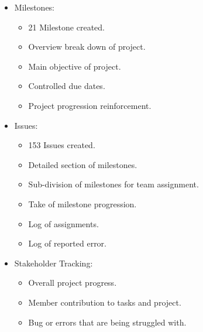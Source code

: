 \documentclass[letterpaper]{article}
\begin{document}
		\begin{itemize}
			\item Milestones:
				\begin{itemize}
					\item 21 Milestone created.
					\item Overview break down of project.
					\item Main objective of project.
					\item Controlled due dates.
					\item Project progression reinforcement.
				\end{itemize}
			\item Issues:
				\begin{itemize}
					\item 153 Issues created.
					\item Detailed section of milestones.
					\item Sub-division of milestones for team assignment.
					\item Take of milestone progression.
					\item Log of assignments.
					\item Log of reported error.
				\end{itemize}
			\item Stakeholder Tracking:
				\begin{itemize}
					\item Overall project progress.
					\item Member contribution to tasks and project.
					\item Bug or errors that are being struggled with.
				\end{itemize}
		\end{itemize}
		
		\vspace{0.2in}
	\section*{\colorbox{black}{}} 
		\vspace{0.1in}
		
\end{document}
